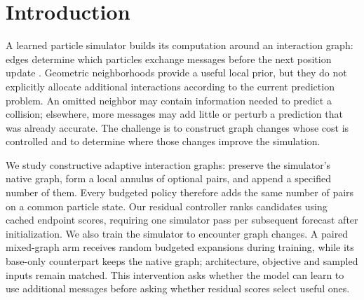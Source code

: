 
\begin{abstract}
Learned particle simulators usually inherit their interaction graphs from geometry, although extra messages can help some predictions and harm others. We construct adaptive interaction graphs by preserving native edges and appending an exact budget of local pairs. Cached residual scores allocate that budget without a second scoring pass after initialization. We pair this controller with graph-exposure training, separating learning to use extra messages from choosing where to place them. Exploratory three-seed studies on Goop, WaterDrop, and Sand compare training and allocation policies on common observed histories and full autonomous rollouts; WaterDrop uses paired continuations. Exposure improves fixed-random rollout error in every Goop and WaterDrop seed, reducing Goop mean MSE from 0.301 to 0.129. Risk-guided placement does not improve consistently: on Sand, exposure narrows the observed risk deficit while worsening cached-risk rollout error. We formalize the distinction between residual risk and interaction benefit, and separate expansion cost from changes in rollout geometry. The results identify training support, placement, and autonomous feedback as distinct requirements for effective adaptive graphs.
\end{abstract}

\section{Introduction}
A learned particle simulator builds its computation around an interaction graph: edges determine which particles exchange messages before the next position update \citep{sanchez2020}. Geometric neighborhoods provide a useful local prior, but they do not explicitly allocate additional interactions according to the current prediction problem. An omitted neighbor may contain information needed to predict a collision; elsewhere, more messages may add little or perturb a prediction that was already accurate. The challenge is to construct graph changes whose cost is controlled and to determine where those changes improve the simulation.

We study constructive adaptive interaction graphs: preserve the simulator's native graph, form a local annulus of optional pairs, and append a specified number of them. Every budgeted policy therefore adds the same number of pairs on a common particle state. Our residual controller ranks candidates using cached endpoint scores, requiring one simulator pass per subsequent forecast after initialization. We also train the simulator to encounter graph changes. A paired mixed-graph arm receives random budgeted expansions during training, while its base-only counterpart keeps the native graph; architecture, objective and sampled inputs remain matched. This intervention asks whether the model can learn to use additional messages before asking whether residual scores select useful ones.

